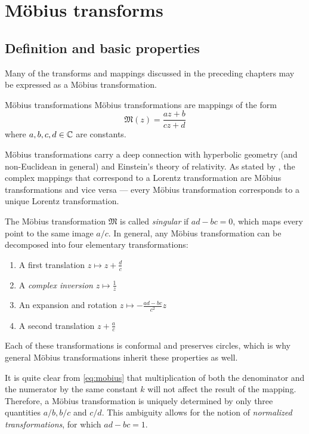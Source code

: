 \chapter{Möbius transforms}
\label{chap:moebius_transforms}

\section{Definition and basic properties}
Many of the transforms and mappings discussed in the preceding chapters may be expressed as a Möbius transformation. 
\begin{thmblock}{Möbius transformations}
    Möbius transformations are mappings of the form \cite{Needham1997} 
        \begin{equation}
            \mathfrak{M}(z) = \frac{az + b}{cz + d} \label{eq:mobius}
        \end{equation}
    where \(a, b, c, d \in \mathbb{C} \) are constants.
\end{thmblock}
Möbius transformations carry a deep connection with hyperbolic geometry (and non-Euclidean in general) and Einstein's theory of relativity. As stated by \citet{Needham1997}, the complex mappings that correspond to a Lorentz transformation are Möbius transformations and vice versa --- every Möbius transformation corresponds to a unique Lorentz transformation.

The Möbius transformation \(\mathfrak{M}\) is called \emph{singular} if \(ad - bc = 0\), which maps every point to the same image \(a/c\). In general, any Möbius transformation can be decomposed into four elementary transformations:
\begin{enumerate}
    \item A first translation \(z \mapsto z + \frac{d}{c}\)
    \item A \emph{complex inversion} \(z \mapsto \frac{1}{z}\)
    \item An expansion and rotation \(z \mapsto -\frac{ad - bc}{c^2}z\)
    \item A second translation \(z + \frac{a}{c}\)
\end{enumerate}
Each of these transformations is conformal and preserves circles, which is why general Möbius transformations inherit these properties as well. 

It is quite clear from \cref{eq:mobius} that multiplication of both the denominator and the numerator by the same constant \(k\) will not affect the result of the mapping. Therefore, a Möbius transformation is uniquely determined by only three quantities \(a/b, b/c\) and \(c/d\). This ambiguity allows for the notion of \emph{normalized transformations}, for which \(ad - bc = 1\). 

